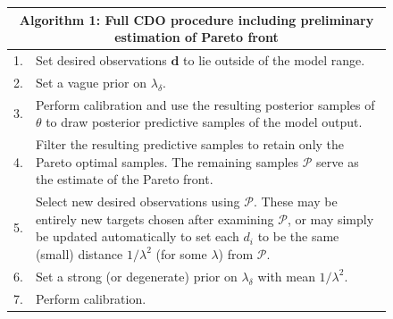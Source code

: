 \documentclass{article}
\begin{document}
\begin{figure}
\centering
\begin{tabular}{|l|p{5in}|}
\hline
\multicolumn{2}{|c|}{Algorithm 1: Full CDO procedure including preliminary estimation of Pareto front}\\
\hline
1.&Set desired observations $\mathbf d$ to lie outside of the model range.\\
2.&  Set a vague prior on $\lambda_\delta$.\\
3.&  Perform calibration and use the resulting posterior samples of $\theta$ to draw posterior predictive samples of the model output.\\
4.&  Filter the resulting predictive samples to retain only the Pareto optimal samples. The remaining samples $\mathcal P$ serve as the estimate of the Pareto front.\\
5.& Select new desired observations using $\mathcal P$. These may be entirely new targets chosen after examining $\mathcal P$, or may simply be updated automatically to set each $d_i$ to be the same (small) distance $1/\lambda^2$ (for some $\lambda$) from $\mathcal P$.\\
6.& Set a strong (or degenerate) prior on $\lambda_\delta$ with mean $1/\lambda^2$.\\
7.& Perform calibration.\\
\hline
\end{tabular}
\label{alg:CDO_alg}
\end{figure}
\end{document}
